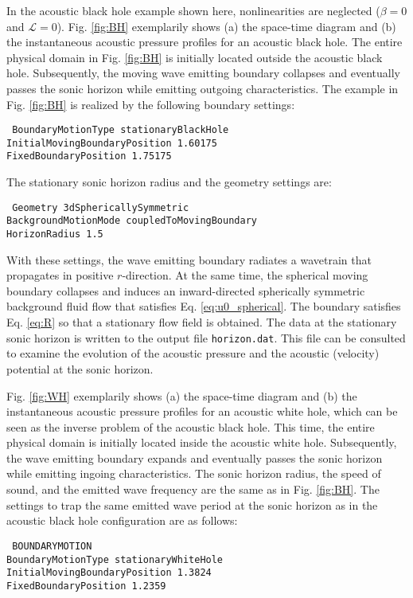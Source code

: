 In the acoustic black hole example shown here, nonlinearities are neglected ($\beta=0$ and $\mathcal{L}=0$). Fig. \ref{fig:BH} exemplarily shows (a) the space-time diagram and (b) the instantaneous acoustic pressure profiles for an acoustic black hole. The entire physical domain in Fig. \ref{fig:BH} is initially located outside the acoustic black hole. Subsequently, the moving wave emitting boundary collapses and eventually passes the sonic horizon while emitting outgoing characteristics. The example in Fig. \ref{fig:BH} is realized by the following boundary settings:

{\tt
BoundaryMotionType stationaryBlackHole \\
InitialMovingBoundaryPosition 1.60175 \\
FixedBoundaryPosition 1.75175
}

The stationary sonic horizon radius and the geometry settings are:

{\tt
Geometry 3dSphericallySymmetric \\
BackgroundMotionMode coupledToMovingBoundary \\
HorizonRadius 1.5
}

With these settings, the wave emitting boundary radiates a wavetrain that propagates in positive $r$-direction. At the same time, the spherical moving boundary collapses and induces an inward-directed spherically symmetric background fluid flow that satisfies Eq. \eqref{eq:u0_spherical}. The boundary satisfies Eq. \eqref{eq:R} so that a stationary flow field is obtained. The data at the stationary sonic horizon is written to the output file {\tt horizon.dat}. This file can be consulted to examine the evolution of the acoustic pressure and the acoustic (velocity) potential at the sonic horizon.

Fig. \ref{fig:WH} exemplarily shows (a) the space-time diagram and (b) the instantaneous acoustic pressure profiles for an acoustic white hole, which can be seen as the inverse problem of the acoustic black hole. This time, the entire physical domain is initially located inside the acoustic white hole. Subsequently, the wave emitting boundary expands and eventually passes the sonic horizon while emitting ingoing characteristics. The sonic horizon radius, the speed of sound, and the emitted wave frequency are the same as in Fig. \ref{fig:BH}. The settings to trap the same emitted wave period at the sonic horizon as in the acoustic black hole configuration are as follows:

{\tt
BOUNDARYMOTION \\
BoundaryMotionType stationaryWhiteHole \\
InitialMovingBoundaryPosition 1.3824 \\
FixedBoundaryPosition 1.2359
}

